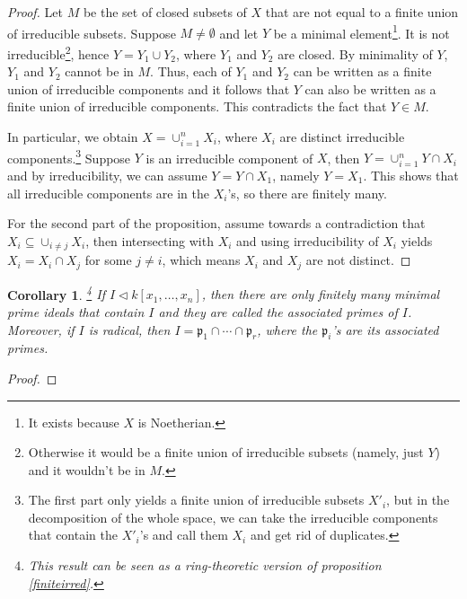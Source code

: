 \documentclass{tufte-handout} %
\newtheorem{cor}[thm]{Corollary}
\theoremstyle{definition}
\theoremstyle{remark}
\newcommand{\lp}{{\mathfrak{p}}}
\begin{document}
\begin{proof}
	Let $M$ be the set of closed subsets of $X$ that are not equal to a finite union of irreducible subsets. Suppose $M \neq \emptyset$ and let $Y$ be a minimal element\footnote{It exists because $X$ is Noetherian.}. It is not irreducible\footnote{Otherwise it would be a finite union of irreducible subsets (namely, just $Y$) and it wouldn't be in $M$.}, hence $Y = Y_1 \cup Y_2$, where $Y_1$ and $Y_2$ are closed. By minimality of $Y$, $Y_1$ and $Y_2$ cannot be in $M$. Thus, each of $Y_1$ and $Y_2$ can be written as a finite union of irreducible components and it follows that $Y$ can also be written as a finite union of irreducible components. This contradicts the fact that $Y \in M$.
	
	In particular, we obtain $X = \cup_{i=1}^n X_i$, where $X_i$ are distinct irreducible components.\footnote{The first part only yields a finite union of irreducible subsets $X'_i$, but in the decomposition of the whole space, we can take the irreducible components that contain the $X'_i$'s and call them $X_i$ and get rid of duplicates.} Suppose $Y$ is an irreducible component of $X$, then $Y = \cup_{i=1}^n Y \cap X_i$ and by irreducibility, we can assume $Y= Y\cap X_1$, namely $Y = X_1$. This shows that all irreducible components are in the $X_i$'s, so there are finitely many.
	
	For the second part of the proposition, assume towards a contradiction that $X_i \subseteq \cup_{i \neq j} X_i$, then intersecting with $X_i$ and using irreducibility of $X_i$ yields $X_i = X_i \cap X_j$ for some $j\neq i$, which means $X_i$ and $X_j$ are not distinct.
\end{proof}

\begin{cor}\footnote{This result can be seen as a ring-theoretic version of proposition \ref{finiteirred}.}
	If $I \lhd k[x_1, \dots, x_n]$, then there are only finitely many minimal prime ideals that contain $I$ and they are called the associated primes of $I$. Moreover, if $I$ is radical, then $I = \lp_1 \cap \cdots \cap \lp_r$, where the $\lp_i$'s are its associated primes.
\end{cor}
\begin{proof}
\end{proof}
\end{document}
